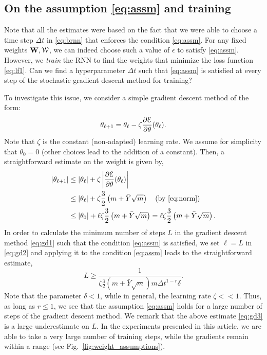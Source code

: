 \documentclass{article} \usepackage{iclr2021_conference,times}
\newcommand{\cW}{\EuScript{W}}
\newcommand{\bW}{{\bf W}}
\newcommand{\ep}{\epsilon}
\newcommand{\Dt}{{\Delta t}}
\newcommand{\E}{\EuScript{E}}
\newcommand{\fref}[1] {Fig.~\ref{#1}}
\begin{document}
\subsection{On the assumption \eqref{eq:assm} and training}
\label{app:explod_training}
Note that all the estimates were based on the fact that we were able to choose a time step $\Dt$ in \eqref{eq:brnn} that enforces the condition \eqref{eq:assm}. For any fixed weights $\bW, \cW$, we can indeed choose such a value of $\ep$ to satisfy \eqref{eq:assm}. However, we \emph{train} the RNN to find the weights that minimize the loss function \eqref{eq:lf1}. Can we find a hyperparameter $\Dt$ such that \eqref{eq:assm} is satisfied at every step of the stochastic gradient descent method for training?

To investigate this issue, we consider a simple gradient descent method of the form:
\begin{equation}
\label{eq:gd1}
\theta_{\ell+1} = \theta_\ell - \zeta \frac{\partial \E}{\partial \theta} (\theta_\ell).
\end{equation}
Note that $\zeta$ is the constant (non-adapted) learning rate. We assume for simplicity that $\theta_0 = 0$ (other choices lead to the addition of a constant). Then, a straightforward estimate on the weight is given by,
\begin{equation}
\label{eq:gd2}
\begin{aligned}
|\theta_{\ell +1}| &\leq |\theta_{\ell}| + \zeta \left | \frac{\partial \E}{\partial \theta} (\theta_\ell) \right | \\
&\leq  |\theta_{\ell}|  + \zeta \frac{3}{2}\left(m + \bar{Y} \sqrt{m}\right) \quad ({\rm by}~\eqref{eq:norm}) \\
&\leq |\theta_0| + \ell \zeta \frac{3}{2}\left(m + \bar{Y} \sqrt{m}\right)   = \ell \zeta \frac{3}{2}\left(m + \bar{Y} \sqrt{m}\right) .
\end{aligned}
\end{equation}
In order to calculate the minimum number of steps $L$ in the gradient descent method \eqref{eq:gd1} such that the condition \eqref{eq:assm} is satisfied, we set $\ell = L$ in \eqref{eq:gd2} and applying it to the condition \eqref{eq:assm} leads to the straightforward estimate,
\begin{equation}
\label{eq:gd3}
L \geq \frac{1}{\zeta \frac{3}{2}\left(m + \bar{Y} \sqrt{m}\right) m \Dt^{1-r} \delta}.
\end{equation}
Note that the parameter $\delta < 1$, while in general, the learning rate $\zeta << 1$. Thus, as long as $r \leq 1$, we see that the assumption \eqref{eq:assm} holds for a large number of steps of the gradient descent method. We remark that the above estimate \eqref{eq:gd3} is a large underestimate on $L$. In the experiments presented in this article, we are able to take a very large number of training steps, while the gradients remain within a range (see \fref{fig:weight_assumptions}).
\end{document}
